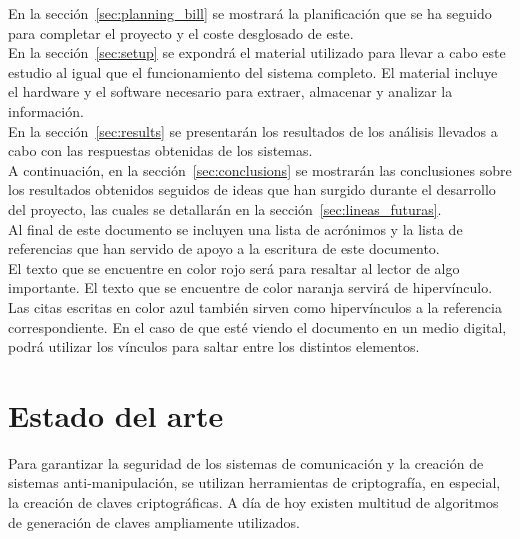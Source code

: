 \documentclass[spanish]{template/minim}
\begin{document}
En la sección~\ref{sec:planning_bill} se mostrará la planificación que se ha seguido para completar el proyecto y el coste desglosado de este.\\

En la sección~\ref{sec:setup} se expondrá el material utilizado para llevar a cabo este estudio al igual que el funcionamiento del sistema completo. El material incluye el hardware y el software necesario para extraer, almacenar y analizar la información.\\

En la sección~\ref{sec:results} se presentarán los resultados de los análisis llevados a cabo con las respuestas obtenidas de los sistemas.\\

A continuación, en la sección~\ref{sec:conclusions} se mostrarán las conclusiones sobre los resultados obtenidos seguidos de ideas que han surgido durante el desarrollo del proyecto, las cuales se detallarán en la sección~\ref{sec:lineas_futuras}.\\

Al final de este documento se incluyen una lista de acrónimos y la lista de referencias que han servido de apoyo a la escritura de este documento.\\

El texto que se encuentre en color {\color{accent}rojo} será para resaltar al lector de algo importante. El texto que se encuentre de color {\color{highlight}naranja} servirá de hipervínculo. Las citas escritas en color {\color{bleu}azul} también sirven como hipervínculos a la referencia correspondiente. En el caso de que esté viendo el documento en un medio digital, podrá utilizar los vínculos para saltar entre los distintos elementos.\\


\newpage
\section{Estado del arte}\label{sec:state_of_the_art}

Para garantizar la seguridad de los sistemas de comunicación y la creación de sistemas anti-manipulación, se utilizan herramientas de criptografía, en especial, la creación de claves criptográficas. A día de hoy existen multitud de algoritmos~ de generación de claves ampliamente utilizados.\\
\end{document}

